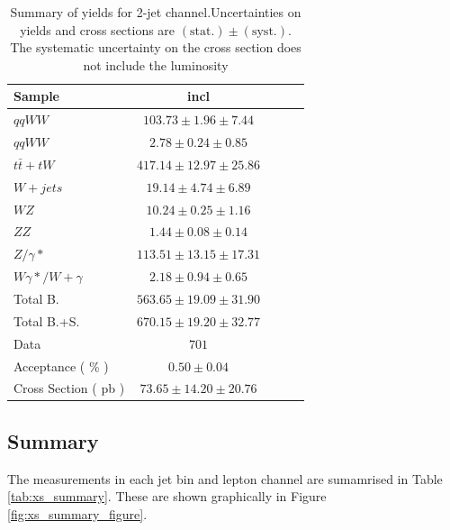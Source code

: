\begin{table}[!ht]
{\small
\begin{center}
\begin{tabular}{|l|c|c|c|c|}
\hline
Sample  & incl  \\ \hline
$qqWW$  & $103.73 \pm 1.96 \pm 7.44 $   \\
$qqWW$  & $2.78 \pm 0.24 \pm 0.85 $ \\
$t\bar{t} + tW$ & $417.14 \pm 12.97 \pm 25.86 $ \\
$W+jets$    & $19.14 \pm 4.74 \pm 6.89 $    \\
$WZ$    & $10.24 \pm 0.25 \pm 1.16 $    \\
$ZZ$    & $1.44 \pm 0.08 \pm 0.14 $ \\
$Z/\gamma*$ & $113.51 \pm 13.15 \pm 17.31 $ \\
$W\gamma*/W+\gamma$ & $2.18 \pm 0.94 \pm 0.65 $ \\
\hline \hline
Total B.    & $563.65 \pm 19.09 \pm 31.90 $ \\ \hline \hline
Total B.+S. & $670.15 \pm 19.20 \pm 32.77 $ \\ \hline \hline
Data    & $701$     \\ \hline \hline
Acceptance ( \% )   & $0.50 \pm 0.04    $\\
Cross Section ( pb )    & $73.65 \pm 14.20 \pm 20.76$   \\ \hline
\end{tabular}
\caption{Summary of yields for 2-jet channel.Uncertainties on yields and cross sections are $\mathrm{(stat.)} \pm \mathrm{(syst.)}$. The systematic uncertainty on the cross section does not include the luminosity}
\label{tab:datayields_wwxsec_2j_incl}
\end{center}}
\end{table}

\clearpage
\subsection{Summary}

The measurements in each jet bin and lepton channel are sumamrised in
Table \ref{tab:xs_summary}.  These are shown graphically 
in Figure \ref{fig:xs_summary_figure}.

